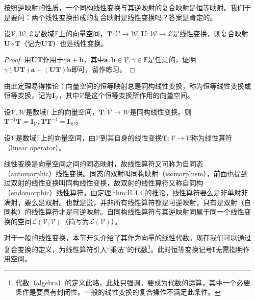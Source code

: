 \documentclass[main.tex]{subfiles}
\begin{document}
按照逆映射的性质，一个同构线性变换与其逆映射的复合映射是恒等映射。我们于是要问：两个线性变换形成的复合映射是线性变换吗？答案是肯定的。

\begin{theorem}\label{thm:II.4.7}
设$\mathcal{V},\mathcal{W},\mathcal{Z}$是数域$\mathbb{F}$上的向量空间，$\mathbf{T}:\mathcal{V}\rightarrow\mathcal{W},\mathbf{U}:\mathcal{W}\rightarrow\mathcal{Z}$是线性变换，则复合映射$\mathbf{U}\circ\mathbf{T}$（记为$\mathbf{UT}$）也是线性变换。
\end{theorem}
\begin{proof}
用$\mathbf{UT}$作用于$\gamma\mathbf{a}+\mathbf{b}$，其中$\mathbf{a},\mathbf{b}\in\mathcal{V},\gamma\in\mathbb{F}$是任意的，证明$\gamma\left(\mathbf{UT}\right)\mathbf{a}+\left(\mathbf{UT}\right)\mathbf{b}$即可，留作练习。
\end{proof}

由此定理易得推论：向量空间的恒等映射总是同构线性变换，称为恒等线性变换或恒等变换，记为$\mathbf{I}_\mathcal{V}$，其中$\mathcal{V}$是这个恒等变换所作用的向量空间。

\begin{example}
设$\mathcal{V},\mathcal{W}$是数域$\mathbb{F}$上的向量空间，$\mathbf{T}:\mathcal{V}\rightarrow\mathcal{W}$是同构线性变换。则$\mathbf{T}^{-1}\mathbf{T}=\mathbf{I}_\mathcal{V},\mathbf{TT}^{-1}=\mathbf{I}_\mathcal{W}$。
\end{example}

\begin{definition}[线性算符]\label{def:II.4.3}
设$\mathcal{V}$是数域$\mathbb{F}$上的向量空间，由$\mathcal{V}$到其自身的线性变换$\mathbf{T}:\mathcal{V}\rightarrow\mathcal{V}$称为线性算符（linear operator）。
\end{definition}

线性变换是向量空间之间的同态映射，故线性算符又可称为自同态（automorphic）线性变换。同态的双射叫同构映射（isomorphism），前面也提到过双射的线性变换叫同构线性变换，故双射的线性算符又称自同构（endomorphic）线性算符。由定理\ref{thm:II.4.4}的推论，线性算符要么是非单射非满射，要么是双射。也就是说，并非所有线性算符都是可逆映射，只有是双射（自同构）的线性算符才是可逆映射。自同构线性算符与其逆映射同属于同一个线性变换的空间$\mathcal{L}\left(\mathcal{V},\mathcal{V}\right)$（简写为$\mathcal{L}\left(\mathcal{V}\right)$）。

对于一般的线性变换，本节开头介绍了其作为向量的线性代数。现在我们可以通过复合变换的定义，为线性算符引入“乘法”的代数\footnote{代数（algebra）的定义此略，此处只强调，要成为代数的运算，其中一个必要条件是要具有封闭性。一般的线性变换的复合操作不满足此条件。}。此时恒等变换记号$\mathbf{I}$无需指明作用空间。
\end{document}
